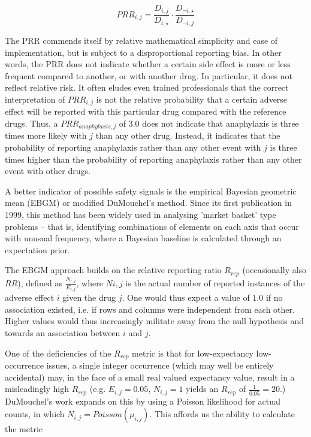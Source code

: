 \documentclass[preprints,communication,submit,oneauthor,pdftex]{Definitions/mdpi}
\begin{document}
$$
   PRR_{i,j} = \frac{D_{i,j}}{D_{i,\star}} \cdot \frac{D_{\neg i, \star}}{D_{\neg i, j}}
$$

The PRR commends itself by relative mathematical simplicity and ease of implementation, but is subject to a disproportional reporting bias. In other words, the PRR does not indicate whether a certain side effect is more or less frequent compared to another, or with another drug. In particular, it does not reflect relative risk. It often eludes even trained professionals that the correct interpretation of $PRR_{i,j}$ is not the relative probability that a certain adverse effect will be reported with this particular drug compared with the reference drugs. Thus, a $PRR_{anaphylaxis,j}$ of 3.0 does not indicate that anaphylaxis is three times more likely with $j$ than any other drug. Instead, it indicates that the probability of reporting anaphylaxis rather than any other event with $j$ is three times higher than the probability of reporting anaphylaxis rather than any other event with other drugs.\cite{moore2003biases}

A better indicator of possible safety signals is the empirical Bayesian geometric mean (EBGM) or modified DuMouchel's method.\cite{dumouchel1999bayesian} Since its first publication in 1999, this method has been widely used in analysing 'market basket' type problems – that is, identifying combinations of elements on each axis that occur with unusual frequency, where a Bayesian baseline is calculated through an expectation prior.\cite{almenoff2003disproportionality,harpaz2013empirical,lee2020safety} 

The EBGM approach builds on the relative reporting ratio $R_{rep}$ (occasionally also $RR$), defined as $\frac{N_{i,j}}{E_{i,j}}$, where $N{i,j}$ is the actual number of reported instances of the adverse effect $i$ given the drug $j$. One would thus expect a value of $1.0$ if no association existed, i.e. if rows and columns were independent from each other. Higher values would thus increasingly militate away from the null hypothesis and towards an association between $i$ and $j$.

One of the deficiencies of the $R_{rep}$ metric is that for low-expectancy low-occurrence issues, a single integer occurrence (which may well be entirely accidental) may, in the face of a small real valued expectancy value, result in a misleadingly high $R_{rep}$ (e.g. $E_{i,j} = 0.05$, $N_{i,j} = 1$ yields an $R_{rep}$ of $\frac{1}{0.05} = 20$.) DuMouchel's work expands on this by using a Poisson likelihood for actual counts, in which $N_{i,j} = Poisson(\mu_{i,j})$.\cite{dumouchel1999bayesian} This affords us the ability to calculate the metric
\end{document}
